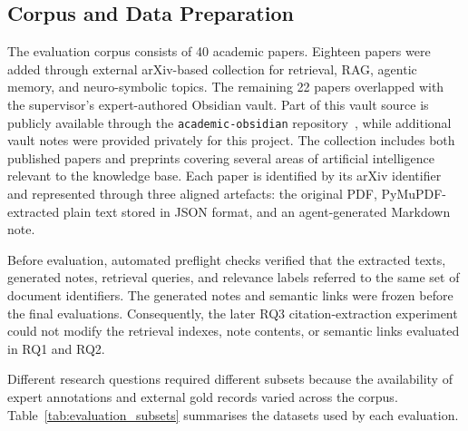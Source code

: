 \documentclass[runningheads]{llncs}
\begin{document}
\subsection{Corpus and Data Preparation}
\label{sec:corpus}

The evaluation corpus consists of 40 academic papers. Eighteen papers
were added through external arXiv-based collection for retrieval, RAG,
agentic memory, and neuro-symbolic topics. The remaining 22 papers
overlapped with the supervisor's expert-authored Obsidian vault. Part
of this vault source is publicly available through the
\texttt{academic-obsidian} repository~\cite{vankriekenAcademicObsidian},
while additional vault notes were provided privately for this project.
The collection includes both published papers and preprints covering
several areas of artificial intelligence relevant to the knowledge base.
Each paper is identified by its arXiv identifier and represented through
three aligned artefacts: the original PDF, PyMuPDF-extracted plain text
stored in JSON format, and an agent-generated Markdown note.

Before evaluation, automated preflight checks verified that the
extracted texts, generated notes, retrieval queries, and relevance
labels referred to the same set of document identifiers. The generated
notes and semantic links were frozen before the final evaluations.
Consequently, the later RQ3 citation-extraction experiment could not
modify the retrieval indexes, note contents, or semantic links evaluated
in RQ1 and RQ2.

Different research questions required different subsets because the
availability of expert annotations and external gold records varied
across the corpus. Table~\ref{tab:evaluation_subsets} summarises the
datasets used by each evaluation.
\end{document}
